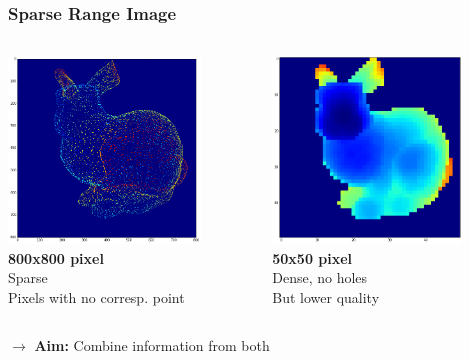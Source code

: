\documentclass{beamer}
\begin{document}
\begin{frame}
\frametitle{Sparse Range Image}
	\begin{columns}
	\begin{column}[T]{.5\textwidth}
		\includegraphics[height=5cm]{high.png}
		\\ \textbf{800x800 pixel} \\
		Sparse \\
		Pixels with no corresp. point
	\end{column}
	\begin{column}[T]{.5\textwidth}
		\includegraphics[height=5cm]{low.png}
		\\ \textbf{50x50 pixel} \\
		Dense, no holes \\
		But lower quality \\
	\end{column}
	\end{columns}
	\vspace{.5cm}
	$\rightarrow$ \textbf{Aim:} Combine information from both 
\end{frame}
\end{document}
